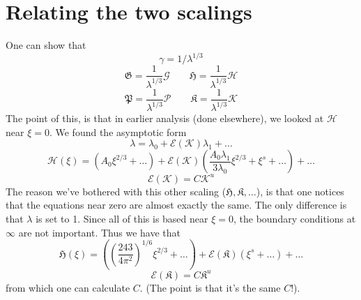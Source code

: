 \documentclass{article}
\newcommand{\cE}{\mathcal{E}}                               %
\newcommand{\fP}{\mathfrak{P}}                               %
\newcommand{\fH}{\mathfrak{H}}                               %
\newcommand{\fG}{\mathfrak{G}}                               %
\newcommand{\fK}{\mathfrak{K}}                               %
\newcommand{\sP}{\mathscr{P}}                               %
\newcommand{\sH}{\mathscr{H}}                               %
\newcommand{\sG}{\mathscr{G}}                               %
\newcommand{\sK}{\mathscr{K}}                               %
\begin{document}
\section{Relating the two scalings}
One can show that 
\[\gamma = 1/\lambda^{1/3} \]
\[\fG = \frac{1}{\lambda^{1/3}} \sG \qquad \fH = \frac{1}{\lambda^{1/3}} \sH\]
\[\fP = \frac{1}{\lambda^{1/3}} \sP \qquad \fK = \frac{1}{\lambda^{1/3}} \sK\]
The point of this, is that in earlier analysis (done elsewhere), we looked 
at $\sH$ near $\xi=0$. We found the asymptotic form
\[ \lambda = \lambda_0 + \cE(\sK)\lambda_1 + \dots \]
\[ \sH(\xi) = (A_0\xi^{2/3}+\dots) + \cE(\sK)\left(\frac{A_0 \lambda_1}
{3 \lambda_0} \xi^{2/3} + \xi^s + \dots \right) + \dots \]
\[ \cE(\sK) = C \sK^u\]
The reason we've bothered with this other scaling ($\fH,\fK,\dots$), is 
that one notices that the equations near zero are almost exactly the same. 
The only difference is that $\lambda$ is set to 1. Since all of this is based 
near $\xi=0$, the boundary conditions at $\infty$ are not important. Thus we 
have that 
\[ \fH(\xi) = \left( \left(\frac{243}{4\pi^2}\right)^{1/6} \xi^{2/3}+\dots
\right) + \cE(\fK)\left( \xi^s + \dots \right) + \dots \]
\[ \cE(\fK) = C \fK^u\]
from which one can calculate $C$. (The point is that it's the same $C$!).

%
%
%
%
%
%
\end{document}
